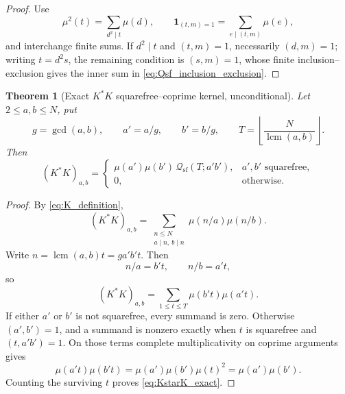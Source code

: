 \documentclass[11pt]{amsart}
\numberwithin{equation}{section}
\theoremstyle{plain}
\newtheorem{theorem}{Theorem}[section]
\theoremstyle{definition}
\theoremstyle{remark}
\newcommand{\one}{\mathbf 1}
\newcommand{\mob}{\mu}
\DeclareMathOperator{\lcm}{lcm}
\begin{document}
\begin{proof}
Use
\begin{equation}
\mob^2(t)=\sum_{d^2\mid t}\mob(d),
\qquad
\one_{(t,m)=1}=\sum_{e\mid(t,m)}\mob(e),
\label{eq:Qsf_indicators}
\end{equation}
and interchange finite sums.  If $d^2\mid t$ and $(t,m)=1$, necessarily $(d,m)=1$; writing $t=d^2s$, the remaining condition is $(s,m)=1$, whose finite inclusion--exclusion gives the inner sum in \eqref{eq:Qsf_inclusion_exclusion}.
\end{proof}

\begin{theorem}[Exact $K^*K$ squarefree--coprime kernel, unconditional]
\label{thm:KstarK_kernel}
Let $2\le a,b\le N$, put
\begin{equation}
g=\gcd(a,b),
\qquad a'=a/g,
\qquad b'=b/g,
\qquad T=\left\lfloor\frac{N}{\lcm(a,b)}\right\rfloor.
\label{eq:KstarK_reduced_parameters}
\end{equation}
Then
\begin{equation}
(K^*K)_{a,b}=
\begin{cases}
\mob(a')\mob(b')\,\mathcal Q_{\mathrm{sf}}(T;a'b'),
& a',b'\text{ squarefree},\\[4pt]
0,&\text{otherwise}.
\end{cases}
\label{eq:KstarK_exact}
\end{equation}
\end{theorem}

\begin{proof}
By \eqref{eq:K_definition},
\begin{equation}
(K^*K)_{a,b}
=\sum_{\substack{n\le N\\a\mid n,\ b\mid n}}
\mob(n/a)\mob(n/b).
\label{eq:KstarK_start}
\end{equation}
Write $n=\lcm(a,b)t=ga'b't$.  Then
\begin{equation}
n/a=b't,
\qquad n/b=a't,
\label{eq:KstarK_quotients}
\end{equation}
so
\begin{equation}
(K^*K)_{a,b}=\sum_{1\le t\le T}\mob(b't)\mob(a't).
\label{eq:KstarK_tsum}
\end{equation}
If either $a'$ or $b'$ is not squarefree, every summand is zero.  Otherwise $(a',b')=1$, and a summand is nonzero exactly when $t$ is squarefree and $(t,a'b')=1$.  On those terms complete multiplicativity on coprime arguments gives
\begin{equation}
\mob(a't)\mob(b't)
=\mob(a')\mob(b')\mob(t)^2
=\mob(a')\mob(b').
\label{eq:KstarK_sign_collapse}
\end{equation}
Counting the surviving $t$ proves \eqref{eq:KstarK_exact}.
\end{proof}
\end{document}
